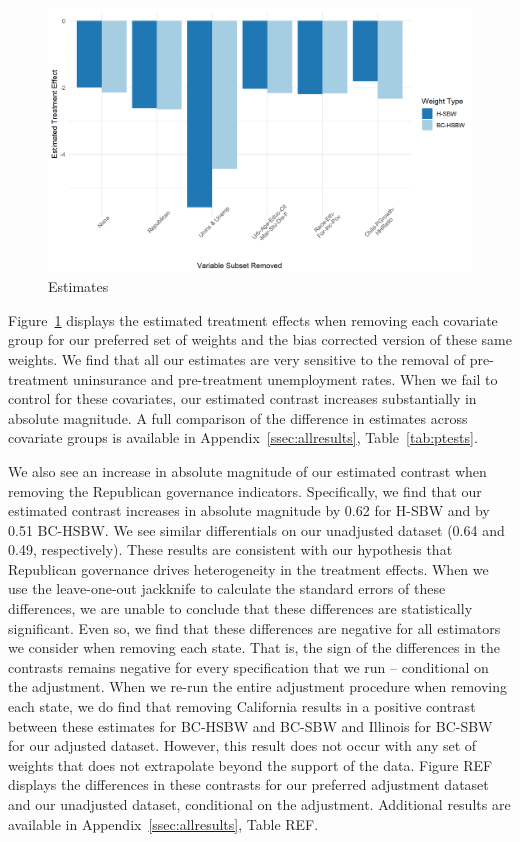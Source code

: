 \documentclass[12pt]{article}
\begin{document}
\begin{figure}[]
\begin{center}
    \includegraphics[scale=0.6]{01_Plots/loo-covariates-main-c1.png}
    \caption{Estimates}
    \label{fig:loocovariates}
\end{center}
\end{figure}

Figure~\ref{fig:loocovariates} displays the estimated treatment effects when removing each covariate group for our preferred set of weights and the bias corrected version of these same weights. We find that all our estimates are very sensitive to the removal of pre-treatment uninsurance and pre-treatment unemployment rates. When we fail to control for these covariates, our estimated contrast increases substantially in absolute magnitude. A full comparison of the difference in estimates across covariate groups is available in Appendix~\ref{ssec:allresults}, Table~\ref{tab:ptests}.

We also see an increase in absolute magnitude of our estimated contrast when removing the Republican governance indicators. Specifically, we find that our estimated contrast increases in absolute magnitude by 0.62 for H-SBW and by 0.51 BC-HSBW. We see similar differentials on our unadjusted dataset (0.64 and 0.49, respectively). These results are consistent with our hypothesis that Republican governance drives heterogeneity in the treatment effects. When we use the leave-one-out jackknife to calculate the standard errors of these differences, we are unable to conclude that these differences are statistically significant. Even so, we find that these differences are negative for all estimators we consider when removing each state. That is, the sign of the differences in the contrasts remains negative for every specification that we run -- conditional on the adjustment. When we re-run the entire adjustment procedure when removing each state, we do find that removing California results in a positive contrast between these estimates for BC-HSBW and BC-SBW and Illinois for BC-SBW for our adjusted dataset. However, this result does not occur with any set of weights that does not extrapolate beyond the support of the data. Figure REF displays the differences in these contrasts for our preferred adjustment dataset and our unadjusted dataset, conditional on the adjustment. Additional results are available in Appendix~\ref{ssec:allresults}, Table REF.
\end{document}

